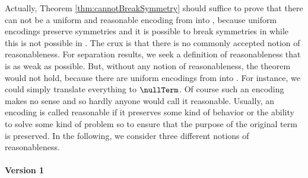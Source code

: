 \documentclass[11pt,techReport]{eptcs}
\begin{document}





Actually, Theorem \ref{thm:cannotBreakSymmetry} should suffice to prove that there can not be a uniform and reasonable encoding from \pimix into \pisep, because uniform encodings preserve symmetries and it is possible to break symmetries in \pimix while this is not possible in \pisep. The crux is that there is no commonly accepted notion of reasonableness. For separation results, we seek a definition of reasonableness that is as weak as possible. But, without any notion of reasonableness, the theorem would not hold, because there are uniform encodings from \pimix into \pisep. For instance, we could simply translate everything to $ \nullTerm $. Of course such an encoding makes no sense and so hardly anyone would call it reasonable. Usually, an encoding is called reasonable if it preserves some kind of behavior or the ability to solve some kind of problem so to ensure that the purpose of the original term is preserved.  In the following, we consider three different notions of reasonableness.

\paragraph{Version 1}
\end{document}
